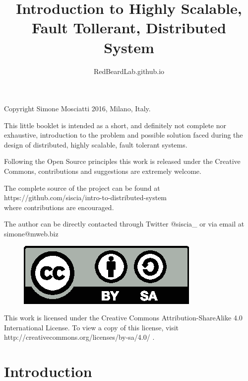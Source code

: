 \documentclass[12pt]{article} %
\title{{\rmfamily Introduction to Highly Scalable, Fault Tollerant, Distributed System}}
\author{RedBeardLab.github.io}
\date{} %
\begin{document}

\maketitle

\newpage

{Copyright Simone Mosciatti 2016, Milano, Italy.}

This little booklet is intended as a short, and definitely not complete nor exhaustive, introduction to the problem and possible solution faced during the design of distributed, highly scalable, fault tolerant systems.

Following the Open Source principles this work is released under the Creative Commons, contributions and suggestions are extremely welcome. 

The complete source of the project can be found at \\
{\ttfamily https://github.com/siscia/intro-to-distributed-system} \\
where contributions are encouraged.

The author can be directly contacted through Twitter {\ttfamily @siscia\_} or via email at {\ttfamily simone@mweb.biz}

\vspace{\fill}

\begin{figure}[h]
	\centering
	\includegraphics{by-sa}
\end{figure}

{\small This work is licensed under the Creative Commons Attribution-ShareAlike 4.0 International License. To view a copy of this license, visit {\ttfamily http://creativecommons.org/licenses/by-sa/4.0/} .}

\section{Introduction}
\end{document}

